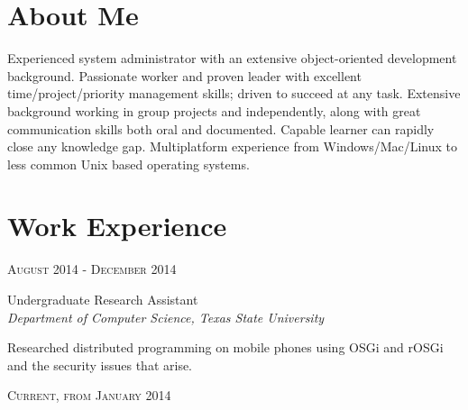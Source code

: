 \documentclass[10pt]{article} %
\begin{document}
\begin{minipage}[t]{0.5\textwidth} %
\vspace{0pt} %
	
\section{About Me}
Experienced system administrator with an extensive object-oriented development background. Passionate worker and proven leader with excellent 
time/project/priority management skills; driven to succeed at any task. Extensive background working in group projects and independently, along with 
great communication skills both oral and documented. Capable learner can rapidly close any  knowledge gap. Multiplatform experience from 
Windows/Mac/Linux to less common Unix based operating systems.


\section{Work Experience} 


{\raggedleft\textsc{August 2014 - December 2014}\par}

{\raggedright\large Undergraduate Research Assistant\\
\textit{Department of Computer Science, Texas State University}\\[5pt]}

\normalsize{Researched distributed programming on mobile phones using OSGi and rOSGi and the security issues that arise.}\\


{\raggedleft\textsc{Current, from January 2014}\par}


\end{minipage}
\end{document}

